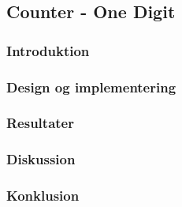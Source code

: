 {
    \newcommand{\labelprefix}{src6-1}

\subsection{Counter - One Digit}

\subsubsection{Introduktion}

\subsubsection{Design og implementering}

\subsubsection{Resultater}


\subsubsection{Diskussion}

\subsubsection{Konklusion}
   
}